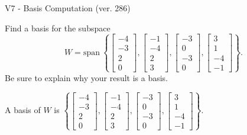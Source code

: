 \begin{exercise}
  \begin{exerciseTitle}V7 - Basis Computation (ver. 286)\end{exerciseTitle}
  \begin{exerciseStatement}
    Find a basis for the subspace 
\[W=\mathrm{span}\ \left\{\left[\begin{array}{r}
-4 \\
-3 \\
2 \\
0
\end{array}\right] , \left[\begin{array}{r}
-1 \\
-4 \\
2 \\
3
\end{array}\right] , \left[\begin{array}{r}
-3 \\
0 \\
-3 \\
0
\end{array}\right] , \left[\begin{array}{r}
3 \\
1 \\
-4 \\
-1
\end{array}\right]\right\}.\]
 Be sure to explain why your result is a basis.


  \end{exerciseStatement}
  \begin{exerciseAnswer}
   A basis of \(W\) is  \(\left\{\left[\begin{array}{r}
-4 \\
-3 \\
2 \\
0
\end{array}\right] , \left[\begin{array}{r}
-1 \\
-4 \\
2 \\
3
\end{array}\right] , \left[\begin{array}{r}
-3 \\
0 \\
-3 \\
0
\end{array}\right] , \left[\begin{array}{r}
3 \\
1 \\
-4 \\
-1
\end{array}\right]\right\}\).
  


  \end{exerciseAnswer}
\end{exercise}